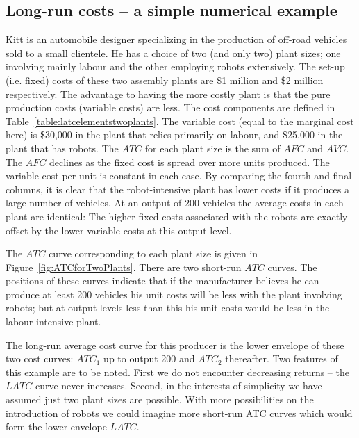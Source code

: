 \newhtmlpage

\subsection*{Long-run costs -- a simple numerical example}

Kitt is an automobile designer specializing in the production of off-road
vehicles sold to a small clientele. He has a choice of two (and only two)
plant sizes; one involving mainly labour and the other employing robots
extensively. The set-up (i.e. fixed) costs of these two assembly
plants are \$1 million and \$2 million respectively. The advantage to having
the more costly plant is that the pure production costs (variable costs) are
less. The cost components are defined in Table~\ref{table:latcelementstwoplants}. The variable cost (equal
to the marginal cost here) is \$30,000 in the plant that relies primarily on
labour, and \$25,000 in the plant that has robots. The $ATC$ for each plant
size is the sum of $AFC$ and $AVC$. The $AFC$ declines as the fixed cost is
spread over more units produced. The variable cost per unit is constant in
each case. By comparing the fourth and final columns, it is clear
that the robot-intensive plant has lower costs if it produces a large number of
vehicles. At an output of 200 vehicles the average costs in each plant are
identical: The higher fixed costs associated with the robots are exactly
offset by the lower variable costs at this output level.

The $ATC$ curve corresponding to each plant size is given in 
Figure~\ref{fig:ATCforTwoPlants}. There are two short-run $ATC$
curves. The positions of these curves indicate that if the manufacturer
believes he can produce at least 200 vehicles his unit costs will be less
with the plant involving robots; but at output levels less than this his
unit costs would be less in the labour-intensive plant.



The long-run average cost curve for this producer is the lower envelope of
these two cost curves: $ATC_1$ up to output 200 and $ATC_2$ thereafter.
Two features of this example are to be noted. First we do not encounter
decreasing returns -- the $LATC$ curve never increases. Second, in the
interests of simplicity we have assumed just two plant sizes are possible.
With more possibilities on the introduction of robots we could imagine more
short-run ATC curves which would form the lower-envelope $LATC$.
